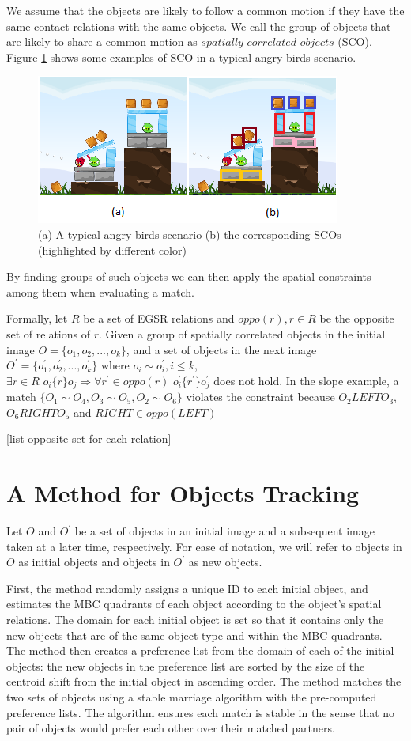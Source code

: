 \documentclass[letterpaper]{article}
\begin{document}
We assume that the objects are likely to follow a common motion if they have the same contact relations with the same objects. We call the group of objects that are likely to share a common motion as $spatially\,\,correlated\,\,objects$ (SCO). Figure \ref{SCOExample} shows some examples of SCO in a typical angry birds scenario. 
\begin{figure}[h!]\label{SCOExample}
\centering\includegraphics[scale=0.7]{SCOScenario.png}\caption{(a) A typical angry birds scenario (b) the corresponding SCOs (highlighted by different color)}
\end{figure}
By finding groups of such objects we can then apply the spatial constraints among them when evaluating a match. 

Formally, let $R$ be a set of EGSR relations and $oppo(r), r\in R$ be the opposite set of relations of $r$. Given a group of spatially correlated objects in the initial image $O = \{o_1, o_2, ... , o_k\}$, and a set of objects in the next image $O^\prime = \{o^{\prime}_1, o^{\prime}_2, ..., o^{\prime}_k \}$ where $o_i \sim o^{\prime}_i, i \leq k$, $\exists r\in R\,\, o_i \{r\} o_j \Rightarrow \forall r^{\prime} \in oppo(r)\,\, o^{\prime}_i \{r^{\prime}\} o^{\prime}_j $ does not hold. In the slope example, a match $\{O_1 \sim O_4, O_3 \sim O_5, O_2 \sim O_6\}$ violates the constraint because $O_2 LEFT O_3$, $O_6 RIGHT O_5$ and $RIGHT \in oppo(LEFT)$  

 [list opposite set for each relation]


\section{A Method for Objects Tracking}
Let $O$ and $O^{\prime}$ be a set of objects in an initial image and a subsequent image taken at a later time, respectively. For ease of notation, we will refer to objects in $O$ as initial objects and objects in $O^{\prime}$ as new objects.

First, the method randomly assigns a unique ID to each initial object, and estimates the MBC quadrants of each object according to the object's spatial relations. The domain for each initial object is set so that it contains only the new objects that are of the same object type and within the MBC quadrants. The method then creates a preference list from the domain of each of the initial objects: the new objects in the preference list are sorted by the size of the centroid shift from the initial object in ascending order. The method matches the two sets of objects using a stable marriage algorithm with the pre-computed preference lists. The algorithm ensures each match is stable in the sense that no pair of objects would prefer each other over their matched partners. 
\end{document}
